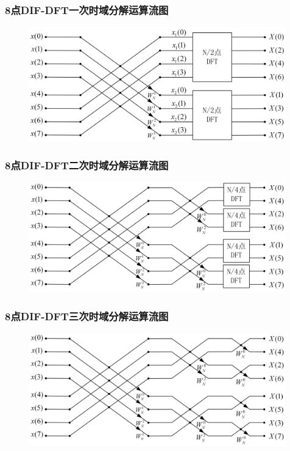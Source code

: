 \documentclass[notheorems,compress,mathserif,table]{beamer}
\begin{document}
\begin{frame}\frametitle{8点DIF-DFT一次时域分解运算流图}%
\begin{figure}[h]
  \centering
  \includegraphics[width=0.99\textwidth]{dif8dftFirst.jpg}
\end{figure}
\end{frame}

\begin{frame}\frametitle{8点DIF-DFT二次时域分解运算流图}%
\begin{figure}[h]
  \centering
  \includegraphics[width=0.99\textwidth]{dif8dftsecond.jpg}
\end{figure}
\end{frame}


\begin{frame}\frametitle{8点DIF-DFT三次时域分解运算流图}%
\begin{figure}[h]
  \centering
  \includegraphics[width=0.99\textwidth]{dif8dftthird.jpg}
\end{figure}
\end{frame}
\end{document}
